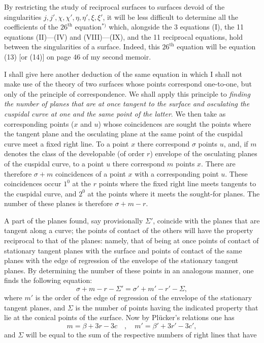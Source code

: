 \documentclass{article}
\begin{document}
By restricting the study of reciprocal surfaces to surfaces devoid of the singularities $j, j', \chi, \chi', \eta, \eta', \xi, \xi'$, it will be less difficult to determine all the coefficients of the $26^{\text{th}}$ equation${}^{*)}$ which, alongside the 3 equations (I), the 11 equations (II)---(IV) and (VIII)---(IX), and the 11 reciprocal equations, hold between the singularities of a surface. Indeed, this $26^{\text{th}}$ equation will be equation (13) [or (14)] on page 46 of my second memoir.

I shall give here another deduction of the same equation in which I shall not make use of the theory of two surfaces whose points correspond one-to-one, but only of the principle of correspondence. We shall apply this principle to \emph{finding the number of planes that are at once tangent to the surface and osculating the cuspidal curve at one and the same point of the latter}. We then take as corresponding points ($x$ and $u$) whose coincidences are sought the points where the tangent plane and the osculating plane at the same point of the cuspidal curve meet a fixed right line. To a point $x$ there correspond $\sigma$ points $u$, and, if $m$ denotes the class of the developable (of order $r$) envelope of the osculating planes of the cuspidal curve, to a point $u$ there correspond $m$ points $x$. There are therefore $\sigma + m$ coincidences of a point $x$ with a corresponding point $u$. These coincidences occur $1^0$ at the $r$ points where the fixed right line meets tangents to the cuspidal curve, and $2^0$ at the points where it meets the sought-for planes. The number of these planes is therefore $\sigma + m - r$.

A part of the planes found, say provisionally $\Sigma'$, coincide with the planes that are tangent along a curve; the points of contact of the others will have the property reciprocal to that of the planes: namely, that of being at once points of contact of stationary tangent planes with the surface and points of contact of the same planes with the edge of regression of the envelope of the stationary tangent planes. By determining the number of these points in an analogous manner, one finds the following equation:
\[
\sigma + m - r - \Sigma' = \sigma' + m' - r' - \Sigma,
\]
where $m'$ is the order of the edge of regression of the envelope of the stationary tangent planes, and $\Sigma$ is the number of points having the indicated property that lie at the conical points of the surface. Now by Plücker's relations one has
\[
m = \beta + 3r - 3c \quad , \quad m' = \beta' + 3r' - 3c',
\]
and $\Sigma$ will be equal to the sum of the respective numbers of right lines that have
\end{document}
